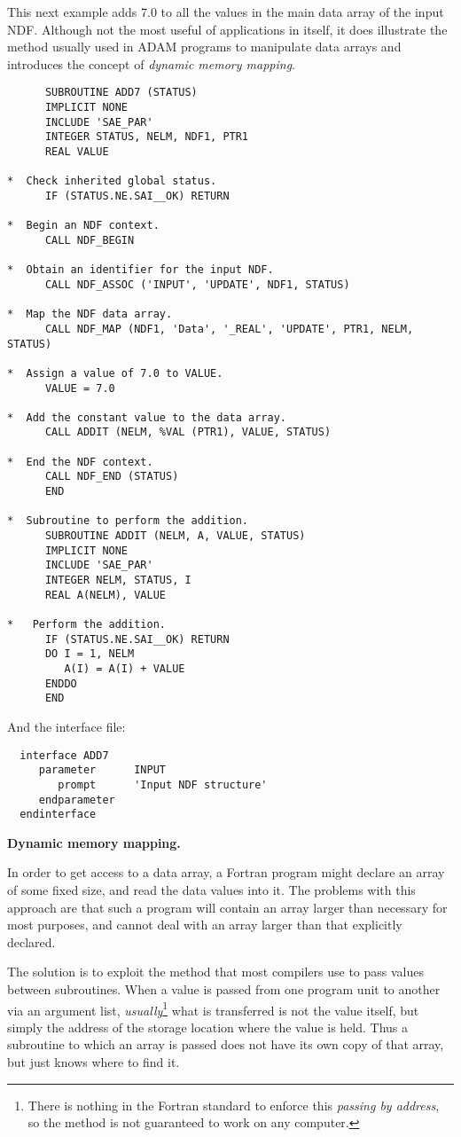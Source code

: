 \documentclass[twoside,11pt]{article}
\renewcommand{\_}{{\tt\char'137}}
\begin{document}
This next example adds 7.0 to all the values in the main data array
of the input NDF.
Although not the most useful of applications in itself, it
does illustrate the method usually used in ADAM programs to
manipulate data arrays and introduces the
concept of {\sl dynamic memory mapping}.
\begin{verbatim}
      SUBROUTINE ADD7 (STATUS)
      IMPLICIT NONE
      INCLUDE 'SAE_PAR'
      INTEGER STATUS, NELM, NDF1, PTR1
      REAL VALUE

*  Check inherited global status.
      IF (STATUS.NE.SAI__OK) RETURN

*  Begin an NDF context.
      CALL NDF_BEGIN

*  Obtain an identifier for the input NDF.
      CALL NDF_ASSOC ('INPUT', 'UPDATE', NDF1, STATUS)

*  Map the NDF data array.
      CALL NDF_MAP (NDF1, 'Data', '_REAL', 'UPDATE', PTR1, NELM, STATUS)

*  Assign a value of 7.0 to VALUE.
      VALUE = 7.0

*  Add the constant value to the data array.
      CALL ADDIT (NELM, %VAL (PTR1), VALUE, STATUS)

*  End the NDF context.
      CALL NDF_END (STATUS)
      END

*  Subroutine to perform the addition.
      SUBROUTINE ADDIT (NELM, A, VALUE, STATUS)
      IMPLICIT NONE
      INCLUDE 'SAE_PAR'
      INTEGER NELM, STATUS, I
      REAL A(NELM), VALUE

*   Perform the addition.
      IF (STATUS.NE.SAI__OK) RETURN
      DO I = 1, NELM
         A(I) = A(I) + VALUE
      ENDDO
      END
\end{verbatim}
And the interface file:
\begin{verbatim}
  interface ADD7
     parameter      INPUT
        prompt      'Input NDF structure'
     endparameter
  endinterface
\end{verbatim}
\newpage
{\large\bf Dynamic memory mapping.}

In order to get access to a data array, a Fortran program might
declare an array of some fixed size, and read the data values
into it.
The problems with this approach are that such a program will
contain an array larger than necessary for most purposes, and
cannot deal with an array larger than that explicitly declared.

The solution is to exploit the method that most compilers
use to pass values between subroutines.
When a value is passed from one program unit to another via an argument
list,
{\sl usually}\footnote{There is nothing in the Fortran standard to enforce this
{\sl passing by address}, so the method is not guaranteed to work on any
computer.}
what is transferred is not the value itself, but simply the address of the
storage location where the value is held.
Thus a subroutine to which an array is passed does not have its own copy
of that array, but just knows where to find it.
\end{document}
